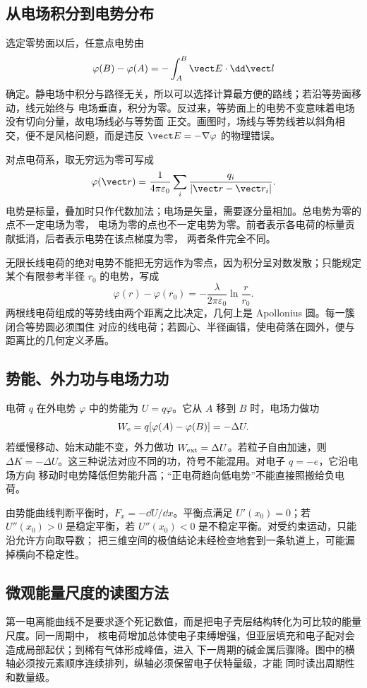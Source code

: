 \subsection*{从电场积分到电势分布}

选定零势面以后，任意点电势由
\[
 \varphi(B)-\varphi(A)=-\int_A^B\vect E\cdot\dd\vect l
\]
确定。静电场中积分与路径无关，所以可以选择计算最方便的路线；若沿等势面移动，线元始终与
电场垂直，积分为零。反过来，等势面上的电势不变意味着电场没有切向分量，故电场线必与等势面
正交。画图时，场线与等势线若以斜角相交，便不是风格问题，而是违反
$\vect E=-\nabla\varphi$ 的物理错误。

对点电荷系，取无穷远为零可写成
\[
 \varphi(\vect r)=\frac1{4\pi\varepsilon_0}\sum_i
 \frac{q_i}{|\vect r-\vect r_i|}.
\]
电势是标量，叠加时只作代数加法；电场是矢量，需要逐分量相加。总电势为零的点不一定电场为零，
电场为零的点也不一定电势为零。前者表示各电荷的标量贡献抵消，后者表示电势在该点梯度为零，
两者条件完全不同。

无限长线电荷的绝对电势不能把无穷远作为零点，因为积分呈对数发散；只能规定某个有限参考半径
$r_0$ 的电势，写成
\[
 \varphi(r)-\varphi(r_0)=-\frac{\lambda}{2\pi\varepsilon_0}
 \ln\frac r{r_0}.
\]
两根线电荷组成的等势线由两个距离之比决定，几何上是 Apollonius 圆。每一簇闭合等势圆必须围住
对应的线电荷；若圆心、半径画错，使电荷落在圆外，便与距离比的几何定义矛盾。

\subsection*{势能、外力功与电场力功}

电荷 $q$ 在外电势 $\varphi$ 中的势能为 $U=q\varphi$。它从 $A$ 移到 $B$ 时，电场力做功
\[
 W_{\rm e}=q[\varphi(A)-\varphi(B)]=-\Delta U.
\]
若缓慢移动、始末动能不变，外力做功 $W_{\rm ext}=\Delta U$。若粒子自由加速，则
$\Delta K=-\Delta U$。这三种说法对应不同的功，符号不能混用。对电子 $q=-e$，它沿电场方向
移动时电势降低但势能升高；“正电荷趋向低电势”不能直接照搬给负电荷。

由势能曲线判断平衡时，$F_x=-\dd U/\dd x$。平衡点满足 $U'(x_0)=0$；若
$U''(x_0)>0$ 是稳定平衡，若 $U''(x_0)<0$ 是不稳定平衡。对受约束运动，只能沿允许方向取导数；
把三维空间的极值结论未经检查地套到一条轨道上，可能漏掉横向不稳定性。

\subsection*{微观能量尺度的读图方法}

第一电离能曲线不是要求逐个死记数值，而是把电子壳层结构转化为可比较的能量尺度。同一周期中，
核电荷增加总体使电子束缚增强，但亚层填充和电子配对会造成局部起伏；到稀有气体形成峰值，进入
下一周期的碱金属后骤降。图中的横轴必须按元素顺序连续排列，纵轴必须保留电子伏特量级，才能
同时读出周期性和数量级。

